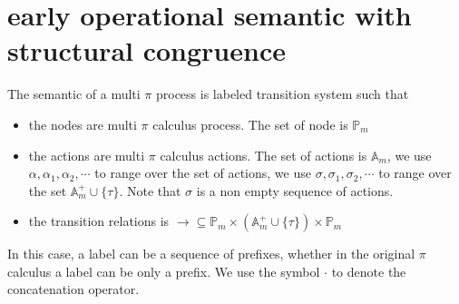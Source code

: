 \section{early operational semantic with structural congruence}

The semantic of a multi $\pi$ process is labeled transition system such that
\begin{itemize}
  \item 
    the nodes are multi $\pi$ calculus process. The set of node is $\mathbb{P}_{m}$
  \item
    the actions are multi $\pi$ calculus actions. The set of actions is $\mathbb{A}_{m}$, we use $\alpha, \alpha_{1}, \alpha_{2},\cdots $ to range over the set of actions, we use $\sigma, \sigma_{1}, \sigma_{2}, \cdots $ to range over the set $\mathbb{A}_{m}^{+} \cup \{\tau\}$. Note that $\sigma$ is a non empty sequence of actions.
  \item
    the transition relations is $\rightarrow\subseteq \mathbb{P}_{m}\times (\mathbb{A}_{m}^{+} \cup \{\tau\})\times \mathbb{P}_{m}$
\end{itemize}

In this case, a label can be a sequence of prefixes, whether in the original $\pi$ calculus a label can be only a prefix. We use the symbol $\cdot$ to denote the concatenation operator.

